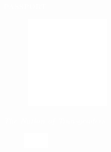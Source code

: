 \begin{titlepage}
    \afterpage{\restorepagecolor}
    \begin{center}
        \bf{
            \textcolor{white}
            {
                \fontsize{28}{28}\selectfont
                PASSPORT
            }
        }
        \begin{figure}[H]
        \vspace{0.4in}
        \begin{center}
        \includegraphics[width=1.8in, height=1.8in]{images/icon.png}
        \vspace{0.1in}
        \end{center}
        \end{figure}
        \bf{
            \textcolor{white}
            {
                \fontsize{10}{10}\selectfont
                \textit{The Nation of Transgenders}
            }
        }
        \begin{figure}[h]
        \centering
        \includegraphics[width=0.5in]{images/epassport.png}
        \end{figure}
    \end{center}
    \restoregeometry
\end{titlepage}